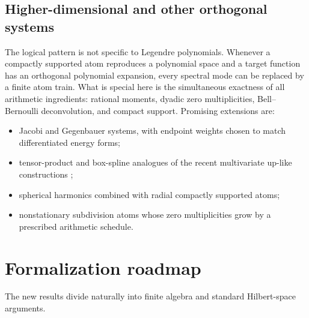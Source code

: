 \documentclass[11pt,oneside]{article}
\numberwithin{equation}{section}
\theoremstyle{definition}
\theoremstyle{remark}
\begin{document}
\subsection{Higher-dimensional and other orthogonal systems}

The logical pattern is not specific to Legendre polynomials.  Whenever a
compactly supported atom reproduces a polynomial space and a target function
has an orthogonal polynomial expansion, every spectral mode can be replaced by
a finite atom train.  What is special here is the simultaneous exactness of
all arithmetic ingredients: rational moments, dyadic zero multiplicities,
Bell--Bernoulli deconvolution, and compact support.  Promising extensions are:
\begin{itemize}
 \item Jacobi and Gegenbauer systems, with endpoint weights chosen to match
 differentiated energy forms;
 \item tensor-product and box-spline analogues of the recent multivariate
 up-like constructions \cite{CharinaContiDyn2024};
 \item spherical harmonics combined with radial compactly supported atoms;
 \item nonstationary subdivision atoms whose zero multiplicities grow by a
 prescribed arithmetic schedule.
\end{itemize}

\section{Formalization roadmap}
\label{sec:formalization}

The new results divide naturally into finite algebra and standard Hilbert-space
arguments.
\end{document}
